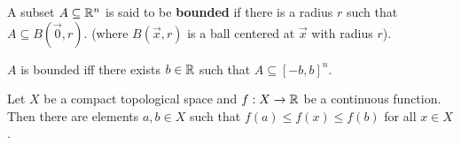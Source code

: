\documentclass[12pt, twosided]{article}
\begin{document}
\begin{df}
  A subset \(A \subseteq \mathbb{R}^n\) is said to be \textbf{bounded} if there is a radius \(r\) such that \(A \subseteq B(\vec{0}, r)\). (where \(B(\vec{x}, r)\) is a ball centered at \(\vec{x}\) with radius \(r\)). 
\end{df}

\begin{fact}
  \(A\) is bounded iff there exists \(b \in \mathbb{R}\) such that \(A \subseteq [-b, b]^n\). 
\end{fact}

\begin{thm}
  Let \(X\) be a compact topological space and \(f: X \to \mathbb{R}\) be a continuous function. Then there are elements \(a, b \in X\) such that \(f(a) \leq f(x) \leq f(b)\) for all \(x \in X\). 
\end{thm}
\end{document}
